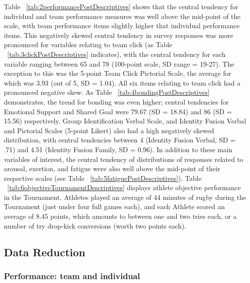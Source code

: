 {


Table ~\ref{tab:2performancePostDescriptives} shows that the central tendency for individual and team performance measures was well above the mid-point of the scale, with team performance items slightly higher that individual performance items.  This negatively skewed central tendency in survey responses was more pronounced for variables relating to team click (as Table ~\ref{tab:3clickPostDescriptives} indicates), with the central tendency for each variable ranging between 65 and 78 (100-point scale, SD range = 19-27). The exception to this was the 5-point Team Click Pictorial Scale, the average for which was 3.93 (out of 5, SD = 1.04).  All six items relating to team click had a pronounced negative skew.  As Table ~\ref{tab:4bondingPostDescriptives} demonstrates, the trend for bonding was even higher; central tendencies for Emotional Support and Shared Goal were 79.67 (SD = 18.84) and 86 (SD = 15.56) respectively.  Group Identification Verbal Scale, and Identity Fusion Verbal and Pictorial Scales (5-point Likert) also had a high negatively skewed distribution, with central tendencies between 4 (Identity Fusion Verbal, SD = .71) and 4.51 (Identity Fusion Family, SD = 0.96).
In addition to these main variables of interest, the central tendency of distributions of responses related to arousal, exertion, and fatigue were also well above the mid-point of their respective scales (see Table ~\ref{tab:5fatiguePostDescriptives}).  Table ~\ref{tab:6objectiveTournamentDescriptives} displays athlete objective performance in the Tournament. Athletes played an average of 44 minutes of rugby during the Tournament (just under four full games each), and each Athlete scored an average of 8.45 points, which amounts to between one and two tries each, or a number of try drop-kick conversions (worth two points each).








\subsection{Data Reduction}


\subsubsection{Performance: team and individual\label{app8:performanceDataReduction}}

}
